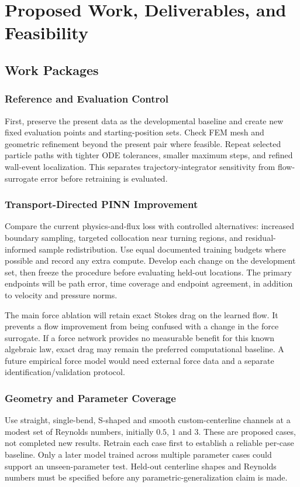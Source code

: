 \chapter{Proposed Work, Deliverables, and Feasibility}
\label{ch:plan}
\section{Work Packages}
\subsection{Reference and Evaluation Control}
First, preserve the present data as the developmental baseline and create
new fixed evaluation points and starting-position sets. Check FEM mesh and
geometric refinement beyond the present pair where feasible. Repeat selected
particle paths with tighter ODE tolerances, smaller maximum steps, and
refined wall-event localization. This separates trajectory-integrator
sensitivity from flow-surrogate error before retraining is evaluated.

\subsection{Transport-Directed PINN Improvement}
Compare the current physics-and-flux loss with controlled alternatives:
increased boundary sampling, targeted collocation near turning regions,
and residual-informed sample redistribution. Use equal documented training
budgets where possible and record any extra compute. Develop each change
on the development set, then freeze the procedure before evaluating held-out
locations. The primary endpoints will be path error, time coverage and
endpoint agreement, in addition to velocity and pressure norms.

The main force ablation will retain exact Stokes drag on the learned flow.
It prevents a flow improvement from being confused with a change in the
force surrogate. If a force network provides no measurable benefit for
this known algebraic law, exact drag may remain the preferred computational
baseline. A future empirical force model would need external force data and
a separate identification/validation protocol.

\subsection{Geometry and Parameter Coverage}
Use straight, single-bend, S-shaped and smooth custom-centerline channels
at a modest set of Reynolds numbers, initially $0.5$, $1$ and $3$. These
are proposed cases, not completed new results. Retrain each case first to
establish a reliable per-case baseline. Only a later model trained across
multiple parameter cases could support an unseen-parameter test. Held-out
centerline shapes and Reynolds numbers must be specified before any
parametric-generalization claim is made.


